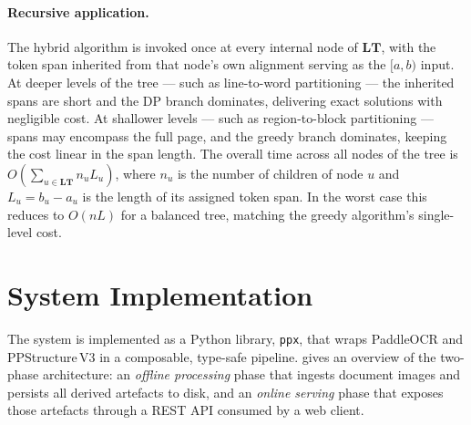 \documentclass{article}
\theoremstyle{definition}
\newcommand{\LT}{\mathbf{LT}}
\begin{document}
\paragraph{Recursive application.}
The hybrid algorithm is invoked once at every internal node of $\LT$, with
the token span inherited from that node's own alignment serving as the
$[a, b)$ input.  At deeper levels of the tree --- such as line-to-word
partitioning --- the inherited spans are short and the DP branch dominates,
delivering exact solutions with negligible cost.  At shallower levels ---
such as region-to-block partitioning --- spans may encompass the full page,
and the greedy branch dominates, keeping the cost linear in the span length.
The overall time across all nodes of the tree is
$O\!\left(\sum_{u \in \LT} n_u L_u\right)$,
where $n_u$ is the number of children of node $u$ and $L_u = b_u - a_u$ is
the length of its assigned token span.  In the worst case this reduces to
$O(nL)$ for a balanced tree, matching the greedy algorithm's single-level cost.

\section{System Implementation}

The system is implemented as a Python library, \texttt{ppx}, that wraps
PaddleOCR and PPStructure\,V3 in a composable, type-safe pipeline.
 gives an overview of the two-phase architecture:
an \emph{offline processing} phase that ingests document images and
persists all derived artefacts to disk, and an \emph{online serving} phase
that exposes those artefacts through a REST API consumed by a web client.
\end{document}
